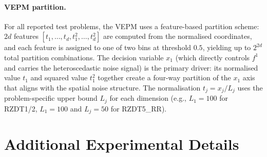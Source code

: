 \documentclass[12pt]{article}
\theoremstyle{plain}
\theoremstyle{definition}
\theoremstyle{remark}
\begin{document}
\begin{table}[h]
\centering
\small
\caption{Noise structure summary for the reported synthetic test problems.}
\label{tab:noise_summary}
\end{table}

\paragraph{VEPM partition.}
For all reported test problems, the VEPM uses a feature-based partition scheme:
$2d$ features $[t_1, \ldots, t_d, t_1^2, \ldots, t_d^2]$ are computed
from the normalised coordinates, and each feature is assigned to one of
two bins at threshold $0.5$, yielding up to $2^{2d}$ total partition
combinations.  The decision variable $x_1$ (which directly controls
$f^1$ and carries the heteroscedastic noise signal) is the primary
driver: its normalised value $t_1$ and squared value $t_1^2$ together
create a four-way partition of the $x_1$ axis that aligns with the
spatial noise structure.  The normalisation $t_j = x_j / L_j$ uses
the problem-specific upper bound $L_j$ for each dimension (e.g.,
$L_1=100$ for RZDT1/2, $L_1=100$ and $L_j=50$ for RZDT5\_RR).

\section{Additional Experimental Details}\label{app:exp_details}
\end{document}

